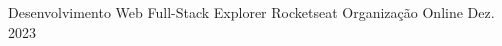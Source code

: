 

\begin{cvhonors}

  \cvhonor
    {Desenvolvimento Web Full-Stack Explorer} %
    {Rocketseat} %
    {Organização Online} %
    {Dez. 2023} %

\end{cvhonors}
